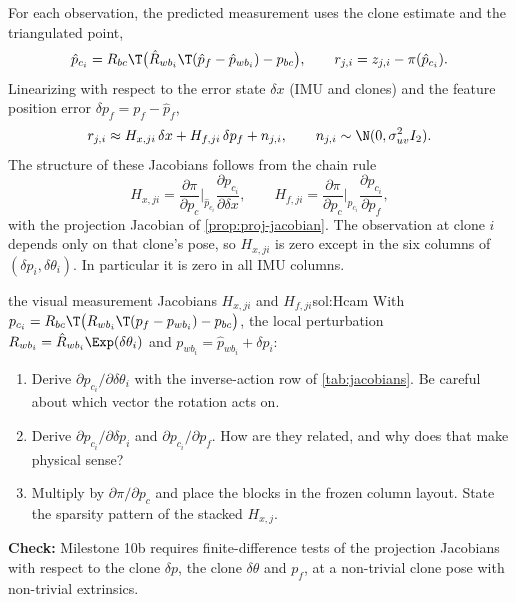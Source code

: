 For each observation, the predicted measurement uses the clone estimate and the triangulated point,
\begin{equation}
  \hat p_{c_i} = R_{bc}\T\big(\hat R_{wb_i}\T(\hat p_f - \hat p_{wb_i}) - p_{bc}\big), \qquad
  r_{j,i} = z_{j,i} - \pi(\hat p_{c_i}) .
\end{equation}
Linearizing with respect to the error state $\delta x$ (IMU and clones) and the feature position error $\delta p_f = p_f - \hat p_f$,
\begin{equation}
  r_{j,i} \approx H_{x,ji}\,\delta x + H_{f,ji}\,\delta p_f + n_{j,i}, \qquad n_{j,i} \sim \N(0, \sigma_{uv}^2I_2).
\end{equation}
The structure of these Jacobians follows from the chain rule
\begin{equation}
  H_{x,ji} = \frac{\partial\pi}{\partial p_c}\Big|_{\hat p_{c_i}}\frac{\partial p_{c_i}}{\partial\delta x},\qquad
  H_{f,ji} = \frac{\partial\pi}{\partial p_c}\Big|_{\hat p_{c_i}}\frac{\partial p_{c_i}}{\partial p_f},
\end{equation}
with the projection Jacobian of \cref{prop:proj-jacobian}. The observation at clone $i$ depends only on that clone's pose, so
$H_{x,ji}$ is zero except in the six columns of $(\delta p_i, \delta\theta_i)$. In particular it is zero in all IMU columns.

\begin{derivex}{the visual measurement Jacobians $H_{x,ji}$ and $H_{f,ji}$}{sol:Hcam}
With $p_{c_i} = R_{bc}\T\big(R_{wb_i}\T(p_f - p_{wb_i}) - p_{bc}\big)$, the local perturbation $R_{wb_i} = \hat R_{wb_i}\Exp(\delta\theta_i)$ and
$p_{wb_i} = \hat p_{wb_i} + \delta p_i$:
\begin{enumerate}
  \item Derive $\partial p_{c_i}/\partial\delta\theta_i$ with the inverse-action row of \cref{tab:jacobians}. Be careful about which
        vector the rotation acts on.
  \item Derive $\partial p_{c_i}/\partial\delta p_i$ and $\partial p_{c_i}/\partial p_f$. How are they related, and why does that make physical sense?
  \item Multiply by $\partial\pi/\partial p_c$ and place the blocks in the frozen column layout. State the sparsity pattern of the stacked
        $H_{x,j}$.
\end{enumerate}
\textbf{Check:} Milestone 10b requires finite-difference tests of the projection Jacobians with respect to the clone
$\delta p$, the clone $\delta\theta$ and $p_f$, at a non-trivial clone pose with non-trivial extrinsics.
\end{derivex}

